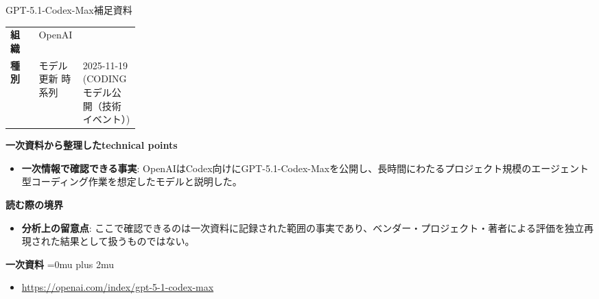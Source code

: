 \begin{technicalnote}{GPT-5.1-Codex-Max}{補足資料}
\begingroup
\begin{tabularx}{\linewidth}{@{}>{\bfseries}p{0.22\linewidth}X@{}}
組織 & OpenAI \\
種別 & モデル更新
時系列 & 2025-11-19 (CODING モデル公開（技術イベント）) \\
\end{tabularx}
\smallskip
{\bfseries 一次資料から整理したtechnical points}
\begin{itemize}[leftmargin=1.5em,itemsep=0.35em]
\item \textbf{一次情報で確認できる事実}: OpenAIはCodex向けにGPT-5.1-Codex-Maxを公開し、長時間にわたるプロジェクト規模のエージェント型コーディング作業を想定したモデルと説明した。
\end{itemize}
\begin{minipage}{\linewidth}
{\bfseries 読む際の境界}
\begin{itemize}[leftmargin=1.5em,itemsep=0.35em]
\item \textbf{分析上の留意点}: ここで確認できるのは一次資料に記録された範囲の事実であり、ベンダー・プロジェクト・著者による評価を独立再現された結果として扱うものではない。
\end{itemize}
\begin{samepage}
{\bfseries 一次資料}
\begingroup\sloppy
\Urlmuskip=0mu plus 2mu\relax
\begin{itemize}[leftmargin=1.5em,itemsep=0.25em]
\item {\scriptsize\url{https://openai.com/index/gpt-5-1-codex-max}}
\end{itemize}
\endgroup
\end{samepage}
\end{minipage}
\endgroup
\end{technicalnote}
\medskip

